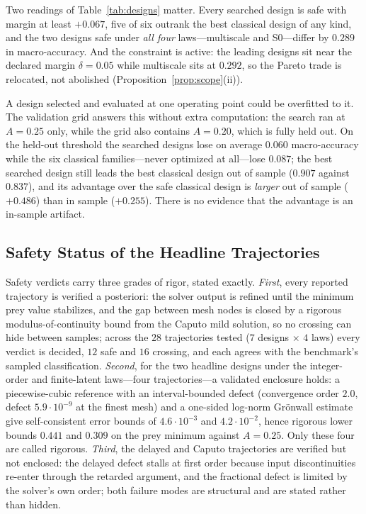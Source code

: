 \documentclass[mathematics,article,accept,pdftex,moreauthors]{Definitions/mdpi}
\begin{document}
Two readings of Table~\ref{tab:designs} matter. Every searched design is safe with margin at least $+0.067$, five of six outrank the best classical design of any kind, and the two designs safe under \emph{all four} laws---multiscale and S0---differ by $0.289$ in macro-accuracy. And the constraint is active: the leading designs sit near the declared margin $\delta=0.05$ while multiscale sits at $0.292$, so the Pareto trade is relocated, not abolished (Proposition~\ref{prop:scope}(ii)).

A design selected and evaluated at one operating point could be overfitted to it. The validation grid answers this without extra computation: the search ran at $A=0.25$ only, while the grid also contains $A=0.20$, which is fully held out. On the held-out threshold the searched designs lose on average $0.060$ macro-accuracy while the six classical families---never optimized at all---lose $0.087$; the best searched design still leads the best classical design out of sample ($0.907$ against $0.837$), and its advantage over the safe classical design is \emph{larger} out of sample ($+0.486$) than in sample ($+0.255$). There is no evidence that the advantage is an in-sample artifact.

\subsection{Safety Status of the Headline Trajectories}
\label{sec:safety-status}

Safety verdicts carry three grades of rigor, stated exactly. \emph{First}, every reported trajectory is verified a posteriori: the solver output is refined until the minimum prey value stabilizes, and the gap between mesh nodes is closed by a rigorous modulus-of-continuity bound from the Caputo mild solution, so no crossing can hide between samples; across the $28$ trajectories tested ($7$ designs $\times$ $4$ laws) every verdict is decided, $12$ safe and $16$ crossing, and each agrees with the benchmark's sampled classification. \emph{Second}, for the two headline designs under the integer-order and finite-latent laws---four trajectories---a validated enclosure holds: a piecewise-cubic reference with an interval-bounded defect (convergence order $2.0$, defect $5.9\cdot10^{-9}$ at the finest mesh) and a one-sided log-norm Gr\"onwall estimate give self-consistent error bounds of $4.6\cdot10^{-3}$ and $4.2\cdot10^{-2}$, hence rigorous lower bounds $0.441$ and $0.309$ on the prey minimum against $A=0.25$. Only these four are called rigorous. \emph{Third}, the delayed and Caputo trajectories are verified but not enclosed: the delayed defect stalls at first order because input discontinuities re-enter through the retarded argument, and the fractional defect is limited by the solver's own order; both failure modes are structural and are stated rather than hidden.
\end{document}
